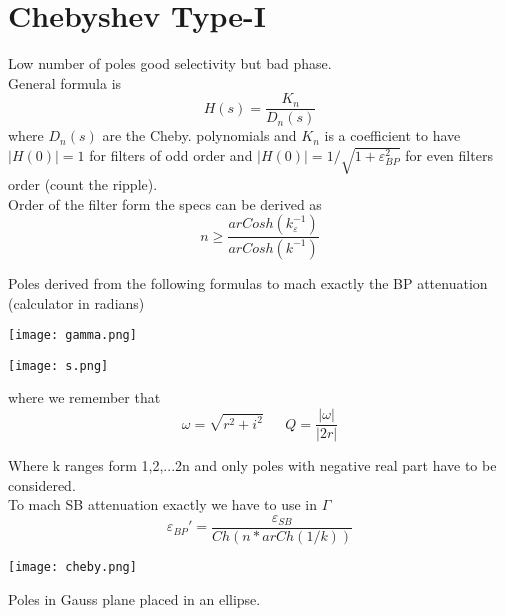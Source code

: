 \section{Chebyshev Type-I}
Low number of poles good selectivity but bad phase.\\
General formula is
\begin{equation}
H(s)=\frac{K_n}{D_n(s)}
\end{equation}
where $D_n(s)$ are the Cheby. polynomials and $K_n$ is a coefficient to have $|H(0)|=1$ for filters of odd order and $|H(0)|=1/\sqrt{1+\varepsilon_{BP}^2}$ for even filters order (count the ripple).\\
\vspace{2mm}
Order of the filter form the specs can be derived as
\begin{equation}
n\ge \frac{arCosh(k_{\varepsilon}^{-1})}{arCosh(k^{-1})}
\end{equation} 

Poles derived from the following formulas to mach exactly the BP attenuation (calculator in radians)

\centering
\texttt{[image: gamma.png]}\\
\raggedright


\centering
\texttt{[image: s.png]}\\
\raggedright

where we remember that 
\begin{equation}
\omega=\sqrt{r^2+i^2} \ \ \ \ \ \ \ Q=\frac{|\omega|}{|2r|}
\end{equation}

Where k ranges form 1,2,...2n and only poles with negative real part have to be considered.\\

To mach SB attenuation exactly we have to use in $\Gamma$
\begin{equation}
\varepsilon_{BP}'=\frac{\varepsilon_{SB}}{Ch(n*arCh(1/k))}
\end{equation}


\centering
\texttt{[image: cheby.png]}\\
\raggedright

Poles in Gauss plane placed in an ellipse.\\





